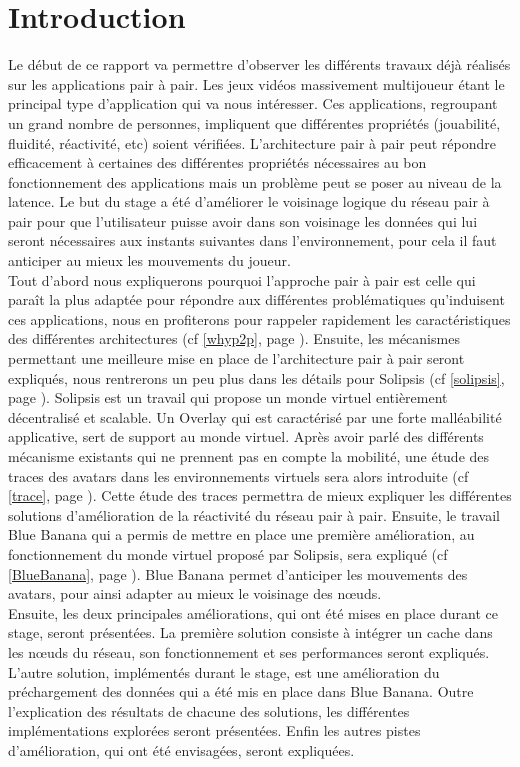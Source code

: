 \section{Introduction}
	Le début de ce rapport va permettre d'observer les différents travaux déjà réalisés sur les applications pair à pair. Les jeux vidéos massivement multijoueur étant le principal type d'application qui va nous intéresser. Ces applications, regroupant un grand nombre de personnes, impliquent que différentes propriétés (jouabilité, fluidité, réactivité, etc) soient vérifiées. L'architecture pair à pair peut répondre efficacement à certaines des différentes propriétés nécessaires au bon fonctionnement des applications mais un problème peut se poser au niveau de la latence. Le but du stage a été d'améliorer le voisinage logique du réseau pair à pair pour que l'utilisateur puisse avoir dans son voisinage les données qui lui seront nécessaires aux instants suivantes dans l'environnement, pour cela il faut anticiper au mieux les mouvements du joueur.\\

	Tout d'abord nous expliquerons pourquoi l'approche pair à pair est celle qui paraît la plus adaptée pour répondre aux différentes problématiques qu'induisent ces applications, nous en profiterons pour rappeler rapidement les caractéristiques des différentes architectures (cf \ref{whyp2p}, page \pageref{whyp2p}). Ensuite, les mécanismes permettant une meilleure mise en place de l'architecture pair à pair seront expliqués, nous rentrerons un peu plus dans les détails pour Solipsis (cf \ref{solipsis}, page \pageref{solipsis}). Solipsis est un travail qui propose un monde virtuel entièrement décentralisé et scalable. Un Overlay qui est caractérisé par une forte malléabilité applicative, sert de support au monde virtuel. Après avoir parlé des différents mécanisme existants qui ne prennent pas en compte la mobilité, une étude des traces des avatars dans les environnements virtuels sera alors introduite (cf \ref{trace}, page \pageref{trace}). Cette étude des traces permettra de mieux expliquer les différentes solutions d'amélioration de la réactivité du réseau pair à pair. Ensuite, le travail Blue Banana qui a permis de mettre en place une première amélioration, au fonctionnement du monde virtuel proposé par Solipsis, sera expliqué (cf \ref{BlueBanana}, page \pageref{BlueBanana}). Blue Banana permet d'anticiper les mouvements des avatars, pour ainsi adapter au mieux le voisinage des nœuds. \\
	
	Ensuite, les deux principales améliorations, qui ont été mises en place durant ce stage, seront présentées. La première solution consiste à intégrer un cache dans les nœuds du réseau, son fonctionnement et ses performances seront expliqués. L'autre solution, implémentés durant le stage, est une amélioration du préchargement des données qui a été mis en place dans Blue Banana. Outre l'explication des résultats de chacune des solutions, les différentes implémentations explorées seront présentées. Enfin les autres pistes d'amélioration, qui ont été envisagées, seront expliquées.

